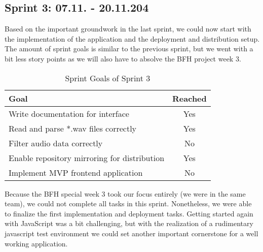 \subsection{Sprint 3: 07.11. - 20.11.204}\label{subsec:sprint-3}
Based on the important groundwork in the last sprint, we could now start with the implementation of the application
and the deployment and distribution setup.
The amount of sprint goals is similar to the previous sprint, but we went with a bit less story points as we will also
have to absolve the BFH project week 3.
\begin{table}[H]
    \centering
    \begin{tabularx}{\textwidth}{X c}
        \toprule
        \textbf{Goal}                                         & \textbf{Reached} \\
        \midrule
        Write documentation for interface                     & Yes              \\
        \midrule
        Read and parse *.wav files correctly                  & Yes              \\
        \midrule
        Filter audio data correctly                           & No               \\
        \midrule
        Enable repository mirroring for distribution          & Yes              \\
        \midrule
        Implement MVP frontend application                    & No               \\
        \bottomrule
    \end{tabularx}
    \caption{Sprint Goals of Sprint 3}\label{tab:sprint_goals3}
\end{table}
Because the BFH special week 3 took our focus entirely (we were in the same team),
we could not complete all tasks in this sprint.
Nonetheless, we were able to finalize the first implementation and deployment tasks.
Getting started again with JavaScript was a bit challenging,
but with the realization of a rudimentary javascript test environment we could set another important cornerstone for
a well working application.

